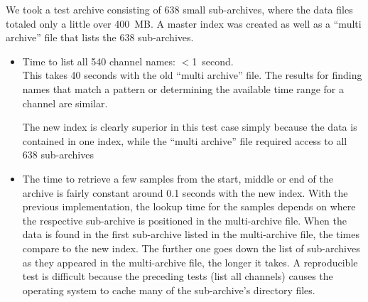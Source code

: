 We took a test archive consisting of 638 small sub-archives,
where the data files totaled only a little over 400~MB.
A master index was created as well as a ``multi archive'' file
that lists the 638 sub-archives.
\begin{itemize}
\item Time to list all  540 channel names: $<$1~second.\\
      This takes 40 seconds with the old ``multi archive'' file.
      The results for finding names that match a pattern or
      determining the available time range for a channel are
      similar.

      The new index is clearly superior in this test case simply
      because the data is contained in one index, while the ``multi
      archive'' file required access to all 638 sub-archives
\item The time to retrieve a few samples from the start, middle or end of the
      archive is fairly constant around 0.1 seconds with the new index.
      With the previous implementation, the lookup time for the samples
      depends on where the respective sub-archive is positioned in the
      multi-archive file. When the data is found in the first
      sub-archive listed in the multi-archive file, the times compare
      to the new index. The further one goes down the list of
      sub-archives as they appeared in the multi-archive file, the
      longer it takes. A reproducible test is difficult because the
      preceding tests (list all channels) causes the operating system
      to cache many of the sub-archive's directory files.
\end{itemize}

